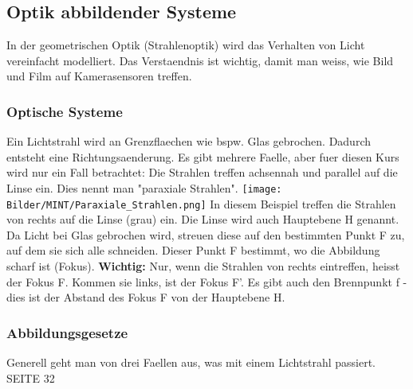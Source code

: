 \subsection{Optik abbildender Systeme}
    In der geometrischen Optik (Strahlenoptik) wird das Verhalten von Licht vereinfacht modelliert. 
    \newline
    Das Verstaendnis ist wichtig, damit man weiss, wie Bild und Film auf Kamerasensoren treffen. 

    \subsubsection{Optische Systeme}
        Ein Lichtstrahl wird an Grenzflaechen wie bspw. Glas gebrochen. Dadurch entsteht eine Richtungsaenderung. Es gibt mehrere Faelle, aber fuer diesen Kurs wird nur ein Fall betrachtet: Die Strahlen treffen achsennah und parallel auf die Linse ein. Dies nennt man "paraxiale Strahlen". 
        \newline
        \texttt{[image: Bilder/MINT/Paraxiale\_Strahlen.png]}
        \newline
        In diesem Beispiel treffen die Strahlen von rechts auf die Linse (grau) ein. Die Linse wird auch Hauptebene H genannt. Da Licht bei Glas gebrochen wird, streuen diese auf den bestimmten Punkt F zu, auf dem sie sich alle schneiden. Dieser Punkt F bestimmt, wo die Abbildung scharf ist (Fokus).
        \newline
        \textbf{Wichtig:} Nur, wenn die Strahlen von rechts eintreffen, heisst der Fokus F. Kommen sie links, ist der Fokus F'.
        \newline \newline
        Es gibt auch den Brennpunkt f - dies ist der Abstand des Fokus F von der Hauptebene H.

    \subsubsection{Abbildungsgesetze}
        Generell geht man von drei Faellen aus, was mit einem Lichtstrahl passiert. 
        SEITE 32    
\newpage